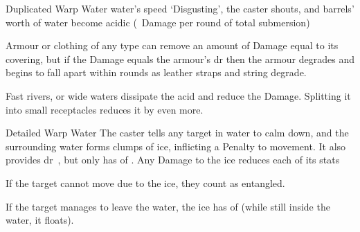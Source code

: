 \ifodd\value{diceNo}

  {Duplicated}%
  {Warp}%
  {Water}%
  {water's speed}%
  {`Disgusting', the caster shouts, and  barrels' worth of water become acidic (\showDam~Damage per round of total submersion)}%
  {
    Armour or clothing of any type can remove an amount of Damage equal to its \gls{covering}, but if the Damage equals the armour's \gls{dr} then the armour degrades and begins to fall apart within  rounds as leather straps and string degrade.

    Fast rivers, or wide waters dissipate the acid and reduce the Damage.
	Splitting it into small receptacles reduces it by even more.
  }

\else

  {Detailed}%
  {Warp}%
  {Water}%
  {}%
  {The caster tells any target in water to calm down, and the surrounding water forms clumps of ice, inflicting a  Penalty to movement.
  It also provides \gls{dr}~, but only has  of .
  Any Damage to the ice reduces each of its stats}%
  {
  If the target cannot move due to the ice, they count as entangled.

  If the target manages to leave the water, the ice has  of  (while still inside the water, it floats).}

\fi
{}
